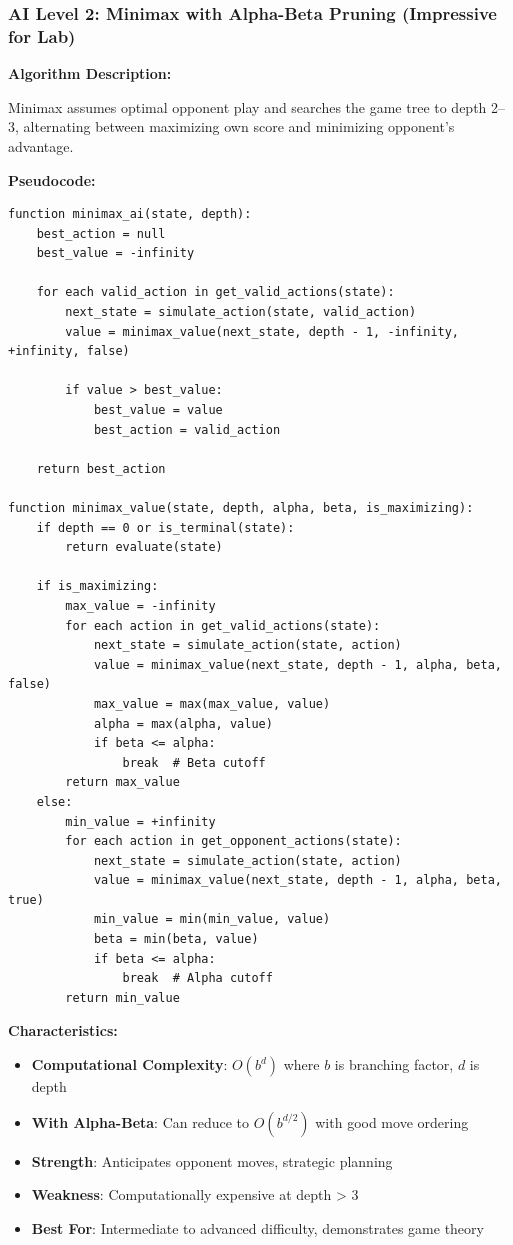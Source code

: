 \documentclass[12pt,a4paper]{article}
\begin{document}
\subsubsection{AI Level 2: Minimax with Alpha-Beta Pruning (Impressive for Lab)}

\textbf{Algorithm Description:}

Minimax assumes optimal opponent play and searches the game tree to depth 2--3, alternating between maximizing own score and minimizing opponent's advantage.

\textbf{Pseudocode:}
\begin{lstlisting}
function minimax_ai(state, depth):
    best_action = null
    best_value = -infinity
    
    for each valid_action in get_valid_actions(state):
        next_state = simulate_action(state, valid_action)
        value = minimax_value(next_state, depth - 1, -infinity, +infinity, false)
        
        if value > best_value:
            best_value = value
            best_action = valid_action
    
    return best_action

function minimax_value(state, depth, alpha, beta, is_maximizing):
    if depth == 0 or is_terminal(state):
        return evaluate(state)
    
    if is_maximizing:
        max_value = -infinity
        for each action in get_valid_actions(state):
            next_state = simulate_action(state, action)
            value = minimax_value(next_state, depth - 1, alpha, beta, false)
            max_value = max(max_value, value)
            alpha = max(alpha, value)
            if beta <= alpha:
                break  # Beta cutoff
        return max_value
    else:
        min_value = +infinity
        for each action in get_opponent_actions(state):
            next_state = simulate_action(state, action)
            value = minimax_value(next_state, depth - 1, alpha, beta, true)
            min_value = min(min_value, value)
            beta = min(beta, value)
            if beta <= alpha:
                break  # Alpha cutoff
        return min_value
\end{lstlisting}

\textbf{Characteristics:}
\begin{itemize}
    \item \textbf{Computational Complexity}: $O(b^d)$ where $b$ is branching factor, $d$ is depth
    \item \textbf{With Alpha-Beta}: Can reduce to $O(b^{d/2})$ with good move ordering
    \item \textbf{Strength}: Anticipates opponent moves, strategic planning
    \item \textbf{Weakness}: Computationally expensive at depth > 3
    \item \textbf{Best For}: Intermediate to advanced difficulty, demonstrates game theory
\end{itemize}
\end{document}
